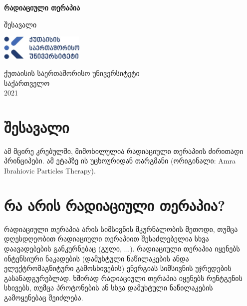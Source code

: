 \documentclass[12pt,a4paper,]{report}
\begin{document}
\begin{titlepage}
   \begin{center}
       \vspace*{1cm}

       \textbf{რადიაციული თერაპია}

       \vspace{0.5cm}
        შესავალი
            
       \vspace{1.5cm}

       \textbf{}

       \vfill
            
            
       \vspace{0.8cm}
     
       \includegraphics[width=0.3\textwidth]{images/kiu_logo}
            
       ქუთაისის საერთაშორისო უნივერსიტეტი\\
       საქართველო\\
       2021
            
   \end{center}
\end{titlepage}

\tableofcontents

\chapter{შესავალი}
ამ მცირე კრებულში, მიმოხილულია რადიაციული თერაპიის ძირითადი პრინციპები. ამ ეტაპზე ის უცხოურიდან თარგმანი (ორიგინალი: Amra Ibrahiovic Particles Therapy). 

\pagebreak

\chapter{რა არის რადიაციული თერაპია?}
რადიაციული თერაპია არის სიმსივნის მკურნალობის მეთოდი, თუმცა დღესდღეობით რადიაციული თერაპიით შესაძლებელია სხვა დაავადებების განკურნებაც (გული, ...). რადიაციული თერაპია იყენებს ინტენსიური ნაკადების (დამუხტული ნაწილაკების ანდა ელექტრომაგნიტური გამოსხივების) ენერგიას სიმსივნის უჯრედების გასანადგურებლად. ხშირად რადიაციული თერაპია იყენებს რენტგენის სხივებს, თუმცა პროტონების ან სხვა დამუხტული ნაწილაკების გამოყენებაც შეიძლება.
\end{document}
